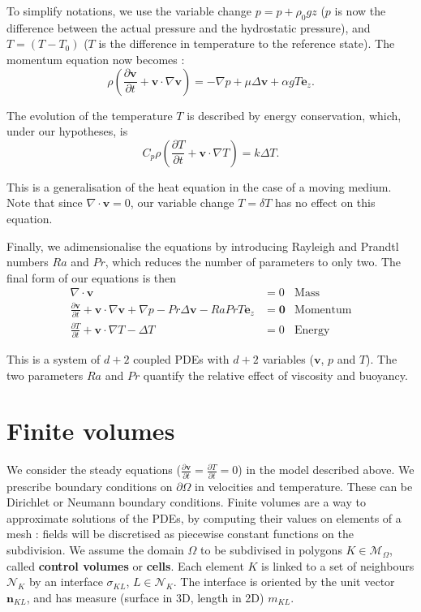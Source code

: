 \documentclass[12pt]{article}
\newcommand{\vb}[1]{\ensuremath{\boldsymbol #1}}
\begin{document}
To simplify notations, we use the variable change $p = p + \rho_0 g z$
($p$ is now the difference between the actual pressure and the
hydrostatic pressure), and $T = (T - T_0)$ ($T$ is the difference in
temperature to the reference state). The momentum equation now becomes
:
\begin{equation}
  \label{ns-mom}
  \rho \left(\frac{\partial \vb{v}}{\partial t} + \vb{v} \cdot
    \nabla \vb{v}\right) = -\nabla p + \mu \Delta \vb{v} + \alpha g
  T \vb{e_z}.
\end{equation}

The evolution of the temperature $T$ is described by energy
conservation, which, under our hypotheses, is
\begin{equation}
  C_p \rho \left(\frac{\partial T}{\partial t} + \vb{v} \cdot \nabla T\right) = k \Delta T.
\end{equation}

This is a generalisation of the heat equation in the case of a moving
medium. Note that since $\nabla \cdot \vb{v} = 0$, our variable change
$T = \delta T$ has no effect on this equation.

Finally, we adimensionalise the equations by introducing Rayleigh and
Prandtl numbers $Ra$ and $Pr$, which reduces the number of parameters
to only two. The final form of our equations is then
\begin{align}
  \label{b-mass}
  \nabla \cdot \vb{v} &= 0& \text{Mass}\\
  \label{b-mom}
  \frac{\partial \vb{v}}{\partial t} + \vb{v} \cdot
  \nabla \vb{v} +\nabla p - Pr \Delta \vb{v} - Ra Pr T
  \vb{e_z} &= \vb{0}& \text{Momentum}\\
  \label{b-ene}
  \frac{\partial T}{\partial t} + \vb{v} \cdot \nabla T - \Delta
  T&=0& \text{Energy}
\end{align}

This is a system of $d + 2$ coupled PDEs with $d+2$ variables
($\vb{v}$, $p$ and $T$). The two parameters $Ra$ and $Pr$ quantify the
relative effect of viscosity and buoyancy.

\section{Finite volumes}
We consider the steady equations ($\frac{\partial \vb{v}}{\partial t}
= \frac{\partial T}{\partial t} = 0$) in the model described above. We
prescribe boundary conditions on $\partial \Omega$ in velocities and
temperature. These can be Dirichlet or Neumann boundary
conditions. Finite volumes are a way to approximate solutions of the
PDEs, by computing their values on elements of a mesh : fields will be
discretised as piecewise constant functions on the subdivision. We
assume the domain $\Omega$ to be subdivised in polygons $K \in
\mathcal{M}_\Omega$, called {\bf control volumes} or {\bf cells}. Each element $K$ is
linked to a set of neighbours $\mathcal{N}_K$ by an interface
$\sigma_{KL}$, $L \in \mathcal N_K$. The interface is oriented by the
unit vector $\vb{n}_{KL}$, and has measure (surface in 3D, length in
2D) $m_{KL}$.
\end{document}
